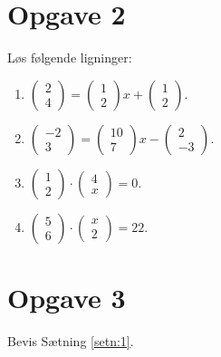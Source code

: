 \section*{Opgave 2}
Løs følgende ligninger:
\begin{enumerate}[label=\roman*)]
\item $\begin{pmatrix} 2 \\ 4\end{pmatrix} = \begin{pmatrix} 1 \\ 2\end{pmatrix}x +\begin{pmatrix} 1 \\ 2\end{pmatrix}$.
\item $  \begin{pmatrix} -2 \\ 3\end{pmatrix} = \begin{pmatrix} 10\\ 7\end{pmatrix}x - \begin{pmatrix} 2 \\ -3\end{pmatrix}$.
\item $\begin{pmatrix} 1 \\ 2\end{pmatrix} \cdot \begin{pmatrix} 4 \\ x\end{pmatrix} = 0$.
\item $\begin{pmatrix} 5 \\ 6\end{pmatrix} \cdot \begin{pmatrix} x \\ 2\end{pmatrix} = 22$.
\end{enumerate}

\section*{Opgave 3}
Bevis Sætning \ref{setn:1}.